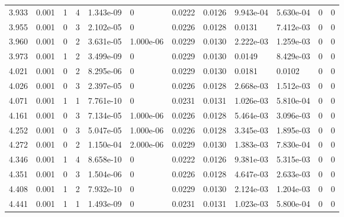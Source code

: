\documentclass[preview]{standalone}
\begin{document}
{{{\begin{tabular}{L{1.2cm}C{1.2cm} C{0.3cm}C{0.5cm} C{1.4cm}C{1.4cm} C{1.4cm}C{1.4cm} C{1.6cm}C{1.6cm} C{1.6cm}C{1.6cm}}
  3.933  &  0.001  & 1     &  4 &  1.343e-09  & 0  &  0.0222&   0.0126& 9.943e-04 & 5.630e-04   &  0 & 0  \\ 
  3.955  &  0.001  & 0     &  3 &  2.102e-05  & 0  &  0.0226&   0.0128& 0.0131 & 7.412e-03   &  0 & 0  \\ 
  3.960  &  0.001  & 0     &  2 &  3.631e-05  & 1.000e-06  &  0.0229&   0.0130& 2.222e-03 & 1.259e-03   &  0 & 0  \\ 
  3.973  &  0.001  & 1     &  2 &  3.499e-09  & 0  &  0.0229&   0.0130& 0.0149 & 8.429e-03   &  0 & 0  \\ 
  4.021  &  0.001  & 0     &  2 &  8.295e-06  & 0  &  0.0229&   0.0130& 0.0181 & 0.0102   &  0 & 0  \\ 
  4.026  &  0.001  & 0     &  3 &  2.397e-05  & 0  &  0.0226&   0.0128& 2.668e-03 & 1.512e-03   &  0 & 0  \\ 
  4.071  &  0.001  & 1     &  1 &  7.761e-10  & 0  &  0.0231&   0.0131& 1.026e-03 & 5.810e-04   &  0 & 0  \\ 
  4.161  &  0.001  & 0     &  3 &  7.134e-05  & 1.000e-06  &  0.0226&   0.0128& 5.464e-03 & 3.096e-03   &  0 & 0  \\ 
  4.252  &  0.001  & 0     &  3 &  5.047e-05  & 1.000e-06  &  0.0226&   0.0128& 3.345e-03 & 1.895e-03   &  0 & 0  \\ 
  4.272  &  0.001  & 0     &  2 &  1.150e-04  & 2.000e-06  &  0.0229&   0.0130& 1.383e-03 & 7.830e-04   &  0 & 0  \\ 
  4.346  &  0.001  & 1     &  4 &  8.658e-10  & 0  &  0.0222&   0.0126& 9.381e-03 & 5.315e-03   &  0 & 0  \\ 
  4.351  &  0.001  & 0     &  3 &  1.504e-06  & 0  &  0.0226&   0.0128& 4.647e-03 & 2.633e-03   &  0 & 0  \\ 
  4.408  &  0.001  & 1     &  2 &  7.932e-10  & 0  &  0.0229&   0.0130& 2.124e-03 & 1.204e-03   &  0 & 0  \\ 
  4.441  &  0.001  & 1     &  1 &  1.493e-09  & 0  &  0.0231&   0.0131& 1.023e-03 & 5.800e-04   &  0 & 0  \\ 
\hline 
\end{tabular} 

}}}
\end{document}
